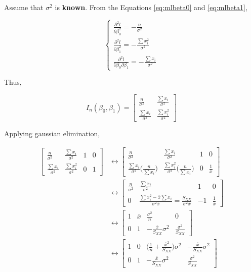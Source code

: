 \documentclass[]{book}
\theoremstyle{definition}
\theoremstyle{definition}
\theoremstyle{definition}
\theoremstyle{remark}
\begin{document}
Assume that \(\sigma^2\) is \textbf{known}. From the Equations
\eqref{eq:mlbeta0} and \eqref{eq:mlbeta1},

\[
\begin{cases}
  \frac{\partial^2 l}{\partial \beta_0^2} = - \frac{n}{\sigma^2} \\
  \frac{\partial^2 l}{\partial \beta_1^2} = - \frac{\sum x_i^2}{\sigma^2} \\
  \frac{\partial^2 l}{\partial \beta_0 \partial \beta_1} = - \frac{\sum x_i}{\sigma^2}
\end{cases}
\]

Thus,

\[
I_n(\beta_0, \beta_1) = \begin{bmatrix}
  \frac{n}{\sigma^2} & \frac{\sum x_i}{\sigma^2} \\
  \frac{\sum x_i}{\sigma^2} & \frac{\sum x_i^2}{\sigma^2}
\end{bmatrix}
\]

Applying gaussian elimination,

\begin{equation*}
  \begin{split}
    \left[
    \begin{array}{cc|cc}
      \frac{n}{\sigma^2} & \frac{\sum x_i}{\sigma^2} & 1 & 0 \\
      \frac{\sum x_i}{\sigma^2} & \frac{\sum x_i^2}{\sigma^2} & 0 & 1
    \end{array}
    \right] & \leftrightarrow \left[
    \begin{array}{cc|cc}
      \frac{n}{\sigma^2} & \frac{\sum x_i}{\sigma^2} & 1 & 0 \\
      \frac{\sum x_i}{\sigma^2}\Big(\frac{n}{\sum x_i} \Big) & \frac{\sum x_i^2}{\sigma^2}\Big(\frac{n}{\sum x_i} \Big) & 0 & \frac{1}{\overline{x}}
    \end{array}
    \right] \\
    & \leftrightarrow \left[
    \begin{array}{cc|cc}
      \frac{n}{\sigma^2} & \frac{\sum x_i}{\sigma^2} & 1 & 0 \\
      0 & \frac{\sum x_i^2 - \overline{x}\sum x_i}{\sigma^2\overline{x}} = \frac{S_{XX}}{\sigma^2\overline{x}} & -1 & \frac{1}{\overline{x}}
    \end{array}
    \right] \\
    & \leftrightarrow \left[
    \begin{array}{cc|cc}
      1 & \overline{x} & \frac{\sigma^2}{n} & 0 \\
      0 & 1 & -\frac{\overline{x}}{S_{XX}}\sigma^2 & \frac{\sigma^2}{S_{XX}}
    \end{array}
    \right] \\
    & \leftrightarrow \left[
    \begin{array}{cc|cc}
      1 & 0 & \bigg(\frac{1}{n} + \frac{\overline{x}^2}{S_{XX}} \bigg)\sigma^2 & -\frac{\overline{x}}{S_{XX}}\sigma^2 \\
      0 & 1 & -\frac{\overline{x}}{S_{XX}}\sigma^2 & \frac{\sigma^2}{S_{XX}}
    \end{array}
    \right]
  \end{split}
\end{equation*}
\end{document}
